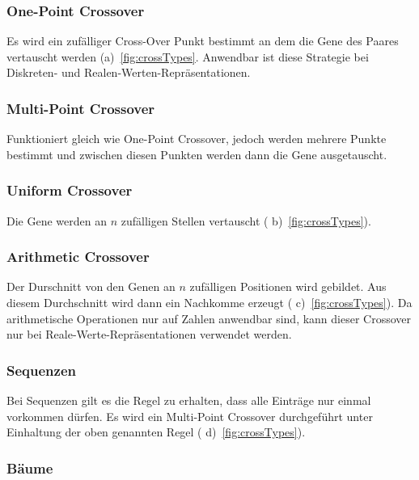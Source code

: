         \subsubsection{One-Point Crossover}

        Es wird ein zufälliger Cross-Over Punkt bestimmt an dem die Gene des Paares vertauscht werden (a)~\vref{fig:crossTypes}.
        Anwendbar ist diese Strategie bei Diskreten- und Realen-Werten-Repräsentationen.

        \subsubsection{Multi-Point Crossover}

          Funktioniert gleich wie One-Point Crossover, jedoch werden mehrere Punkte bestimmt und
          zwischen diesen Punkten werden dann die Gene ausgetauscht.

        \subsubsection{Uniform Crossover}

          Die Gene werden an \(n\) zufälligen Stellen vertauscht ( b)~\vref{fig:crossTypes}).

        \subsubsection{Arithmetic Crossover}

          Der Durschnitt von den Genen an \(n\) zufälligen Positionen wird gebildet.
          Aus diesem Durchschnitt wird dann ein Nachkomme erzeugt ( c)~\vref{fig:crossTypes}).
          Da arithmetische Operationen nur auf Zahlen anwendbar sind,
          kann dieser Crossover nur bei Reale-Werte-Repräsentationen verwendet werden.

        \subsubsection{Sequenzen}

          Bei Sequenzen gilt es die Regel zu erhalten, dass alle Einträge nur einmal vorkommen dürfen.
          Es wird ein Multi-Point Crossover durchgeführt unter Einhaltung der oben genannten Regel ( d)~\vref{fig:crossTypes}).

        \subsubsection{Bäume}

